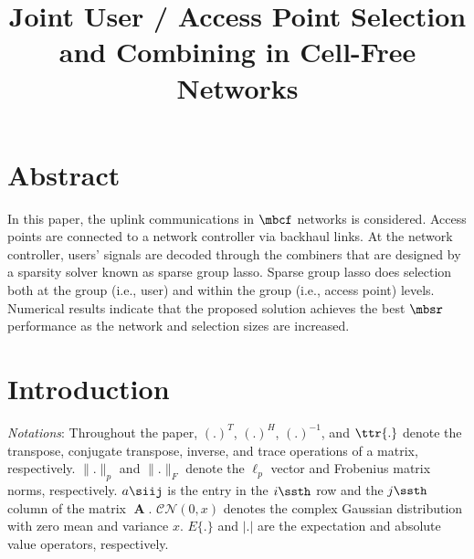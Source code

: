 \documentclass[journal]{IEEEtran}
\begin{document}
\title{Joint User / Access Point Selection and Combining in Cell-Free Networks}
\maketitle

\section*{Abstract} %
In this paper, the uplink communications in $\mbcf$ networks is considered. Access points are connected to a network controller via backhaul links. At the network controller, users' signals are decoded through the combiners that are designed by a sparsity solver known as sparse group lasso. Sparse group lasso does selection both at the group (i.e., user) and within the group (i.e., access point) levels. Numerical results indicate that the proposed solution achieves the best $\mbsr$ performance as the network and selection sizes are increased.

\section{Introduction} \label{sec:Introduction}
\textit{Notations}: Throughout the paper, $(.)^T$, $(.)^H$, $(.)^{-1}$, and $\ttr\{.\}$ denote the transpose, conjugate transpose, inverse, and trace operations of a matrix, respectively. $\|.\|_p$ and $\|.\|_F$ denote the $\ell_p$ vector and Frobenius matrix norms, respectively. $a\siij$ is the entry in the $i\ssth$ row and the $j\ssth$ column of the matrix $\mbfA$. ${\mathcal{CN}(0,x)}$ denotes the complex Gaussian distribution with zero mean and variance $x$. $E\{.\}$ and $|.|$ are the expectation and absolute value operators, respectively.
\end{document}

